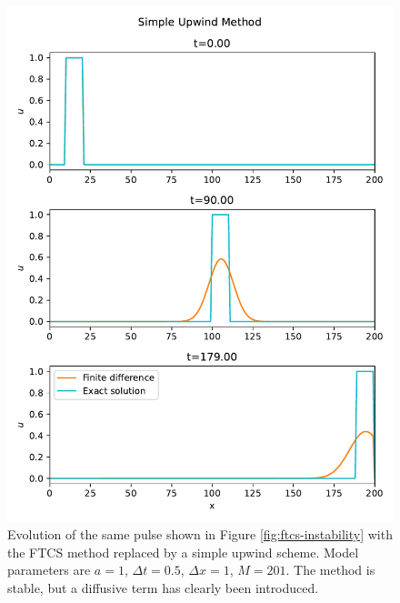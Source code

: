 \documentclass[%
 reprint,
 amsmath,amssymb,
 aps,
]{revtex4-2}
\begin{document}
\begin{figure}
\includegraphics[width=0.9\linewidth]{proj2-1/snapshots-upwind.pdf}
\caption{\label{fig:upwind-snapshots}Evolution of the same pulse shown in Figure \ref{fig:ftcs-instability} with the FTCS method replaced by a simple upwind scheme. Model parameters are $a=1$, $\Delta t=0.5$, $\Delta x=1$, $M=201$. The method is stable, but a diffusive term has clearly been introduced.}
\end{figure}
\end{document}
